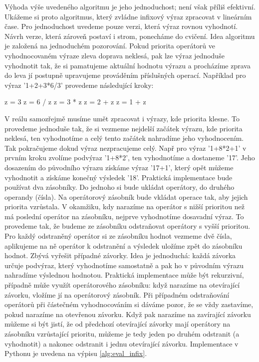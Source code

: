 
Výhoda výše uvedeného algoritmu je jeho jednoduchost; není však příliš efektivní.
Ukážeme si proto algoritmus, který zvládne infixový výraz zpracovat v lineárním
čase. Pro jednoduchost uvedeme pouze verzi, která výraz rovnou vyhodnotí.
Návrh verze, která zároveň postaví i strom, ponecháme do cvičení. Idea algoritmu
je založená na jednoduchém pozorování. Pokud priorita operátorů ve vyhodnocovaném
výraze zleva doprava neklesá, pak lze výraz jednoduše vyhodnotit tak, že si
pamatujeme aktuální hodnotu výrazu a procházíme zprava do leva jí postupně
upravujeme prováděním příslušných operací. Například pro výraz '1+2+3*6/3'
provedeme následující kroky:

\begin{python}
 z = 3
 z = 6 / z
 z = 3 * z
 z = 2 + z
 z = 1 + z
\end{python}

V reálu samozřejmě musíme umět zpracovat i výrazy, kde priorita klesne. To
provedeme jednoduše tak, že si vezmeme nejdelší začátek výrazu, kde
priorita neklesá, ten vyhodnotíme a celý tento začátek nahradíme jeho vyhodnocením.
Tak pokračujeme dokud výraz nezpracujeme celý. Např pro výraz '1+8*2+1'
v prvním kroku zvolíme podvýraz '1+8*2', ten vyhodnotíme a dostaneme '17'. Jeho
dosazením do původního výrazu získáme výraz '17+1', který opět můžeme vyhodnotit
a získáme konečný výsledek '18'. Praktická implementace bude používat dva
zásobníky. Do jednoho si bude ukládat operátory, do druhého operandy (čísla).
Na operátorový zásobník bude vkládat operace tak, aby jejich priorita vzrůstala.
V okamžiku, kdy narazíme na operátor s nižší prioritou než má poslední operátor
na zásobníku, nejprve vyhodnotíme dosavadní výraz. To provedeme tak, že budeme
ze zásobníku odstraňovat operátory s vyšší prioritou. Pro každý odstraněný operátor
si ze zásobníku hodnot vezmeme dvě čísla, aplikujeme na ně operátor k odstranění
a výsledek uložíme zpět do zásobníku hodnot. Zbývá vyřešit případné závorky.
Idea je jednoduchá: každá závorka určuje podvýraz, který vyhodnotíme samostatně
a pak ho v původním výrazu nahradíme výslednou hodnotou. Praktická implementace
může být rekurzivní, případně může využít operátorového zásobníku: když narazíme
na otevírající závorku, vložíme jí na operátorový zásobník. Při případném
odstraňování operátorů při částečném vyhodnocováním si dáváme pozor, že se
vždy zastavíme, pokud narazíme na otevřenou závorku. Když pak narazíme na
zavírající závorku můžeme si být jistí, že od předchozí otevírající závorky
mají operátory na zásobníku vzrůstající prioritu, můžeme je tedy jeden po
druhém odstranit (a vyhodnotit) a nakonec odstranit i jednu otevírající závorku.
Implementace v Pythonu je uvedena na výpisu \ref{alg:eval_infix}.

